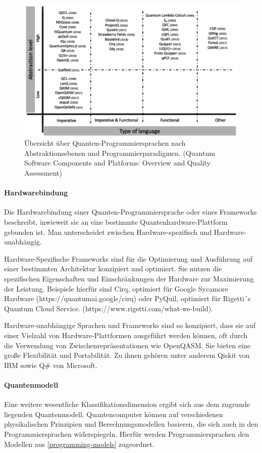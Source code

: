 \begin{figure}[H]
    \centering
    \includegraphics[width=1\linewidth]{images/quantum-programming/Quantum-Programming-Landscape.png}
    \caption{Übersicht über Quanten-Programmiersprachen nach Abstraktionsebenen und Programmierparadigmen. (Quantum Software Components and Platforms: Overview and Quality Assessment)}
    \label{fig:quantum-landscape}
\end{figure}

\paragraph{Hardwarebindung}
Die Hardwarebindung einer Quanten-Programmiersprache oder eines Frameworks beschreibt, inwieweit sie an eine bestimmte Quantenhardware-Plattform gebunden ist. Man unterscheidet zwischen Hardware-spezifisch und Hardware-unabhängig.

Hardware-Spezifische Frameworks sind für die Optimierung und Ausführung auf einer bestimmten Architektur konzipiert und optimiert. Sie nutzen die spezifischen Eigenschaften und Einschränkungen der Hardware zur Maximierung der Leistung. Beispiele hierfür sind Cirq, optimiert für Google Sycamore Hardware (https://quantumai.google/cirq) oder PyQuil, optimiert für Rigetti´s Quantum Cloud Service. (https://www.rigetti.com/what-we-build).

Hardware-unabhängige Sprachen und Frameworks sind so konzipiert, dass sie auf einer Vielzahl von Hardware-Plattformen ausgeführt werden können, oft durch die Verwendung von Zwischenrepräsentationen wie OpenQASM. Sie bieten eine große Flexibilität und Portabilität. Zu ihnen gehören unter anderem Qiskit von IBM sowie Q\# von Microsoft.

\paragraph{Quantenmodell} 
Eine weitere wesentliche Klassifikationsdimension ergibt sich aus dem zugrunde liegenden Quantenmodell. Quantencomputer können auf verschiedenen physikalischen Prinzipien und Berechnungsmodellen basieren, die sich auch in den Programmiersprachen widerspiegeln. Hierfür werden Programmiersprachen den Modellen aus \ref{programming-models} zugeordnet.

